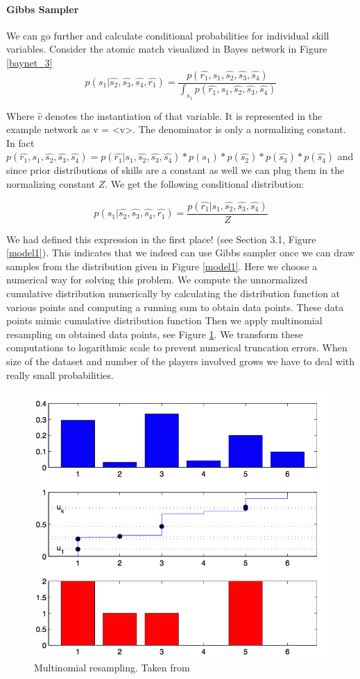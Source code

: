 \documentclass[12pt]{article}
\begin{document}
\paragraph{Gibbs Sampler}

We can go further and calculate conditional probabilities for individual skill variables. Consider the atomic match visualized in Bayes network in Figure \ref{baynet_3}
$$p(s_1 | \hat{s_2}, \hat{s_3}, \hat{s_4}, \hat{r_1}) = \frac{p(\hat{r_1} , s_1, \hat{s_2}, \hat{s_3}, \hat{s_4})}{\int_{s_1} p(\hat{r_1} , s_1, \hat{s_2}, \hat{s_3}, \hat{s_4})}$$

Where $\hat{v}$ denotes the instantiation of that variable. It is represented in the example network as v = <v>. The denominator is only a normalizing constant. In fact $p(\hat{r_1} , s_1, \hat{s_2}, \hat{s_3}, \hat{s_4}) = p(\hat{r_1} | s_1, \hat{s_2}, \hat{s_3}, \hat{s_4}) * p(s_1) * p(\hat{s_2}) * p(\hat{s_3}) * p(\hat{s_4})$ and since prior distributions of skills are a constant as well we can plug them in the normalizing constant $Z$. We get the following conditional distribution:

$$p(s_1 | \hat{s_2}, \hat{s_3}, \hat{s_4}, \hat{r_1}) = \frac{p(\hat{r_1} | s_1, \hat{s_2}, \hat{s_3}, \hat{s_4})}{Z}$$

We had defined this expression in the first place! (see Section 3.1, Figure \ref{model1}). This indicates that we indeed can use Gibbs sampler once we can draw samples from the distribution given in Figure \ref{model1}. Here we choose a numerical way for solving this problem. We compute the unnormalized cumulative distribution numerically by calculating the distribution function at various points and computing a running sum to obtain data points. These data points mimic cumulative distribution function Then we apply multinomial resampling on obtained data points, see Figure \ref*{multinom}. We transform these computations to logarithmic scale to prevent numerical truncation errors. When size of the dataset and number of the players involved grows we have to deal with really small probabilities. 



\begin{figure}[!ht]
	\centering
	\includegraphics[width=0.55\columnwidth]{multinom}	
	\caption{Multinomial resampling. Taken from \cite{cemgil2009notes}}
	\label{multinom}
\end{figure}
\end{document}

